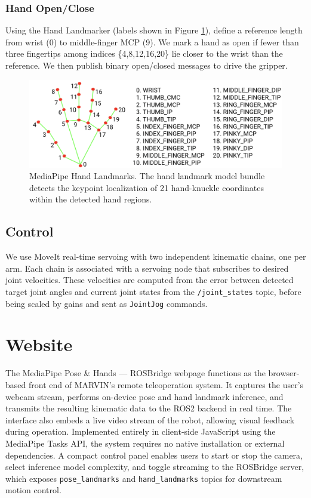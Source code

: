 \documentclass[manuscript,screen]{acmart} %
\begin{document}
\subsubsection{Hand Open/Close}
Using the Hand Landmarker (labels shown in Figure \ref{fig:hand-landmarks}), 
define a reference length from wrist (0) to middle-finger MCP (9). 
We mark a hand as open if fewer than three fingertips among indices 
\{4,8,12,16,20\} lie closer to the wrist than the reference. We then 
publish binary open/closed messages to drive the gripper.

\begin{figure}[htbp]
  \centering
  \includegraphics[width=0.5\linewidth]{assets/hand-landmarks.png}
  \caption{MediaPipe Hand Landmarks. The hand landmark model bundle detects the keypoint localization of 21 hand-knuckle coordinates within the detected hand regions.}
  \label{fig:hand-landmarks}
\end{figure}

\subsection{Control}
We use MoveIt real-time servoing with two independent kinematic chains, one per arm. 
Each chain is associated with a servoing node that subscribes to desired joint 
velocities. These velocities are computed from the error between detected 
target joint angles and current joint states from the \texttt{/joint\_states} 
topic, before being scaled by gains and sent as \texttt{JointJog} commands.

\section{Website}
The MediaPipe Pose \& Hands — ROSBridge webpage functions as the browser-based 
front end of MARVIN’s remote teleoperation system. It captures the user’s webcam 
stream, performs on-device pose and hand landmark inference, and transmits the 
resulting kinematic data to the ROS2 backend in real time. The interface also 
embeds a live video stream of the robot, allowing visual feedback during operation. 
Implemented entirely in client-side JavaScript using the MediaPipe Tasks API, 
the system requires no native installation or external dependencies. 
A compact control panel enables users to start or stop the camera, select inference 
model complexity, and toggle streaming to the ROSBridge server, which exposes 
\texttt{pose\_landmarks} and \texttt{hand\_landmarks} topics for downstream 
motion control.
\end{document}
